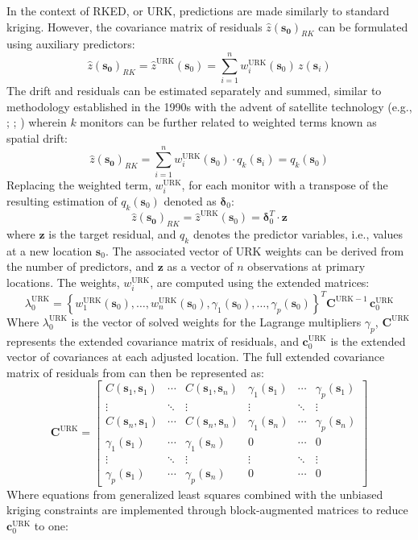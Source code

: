 In the context of RKED, or URK, predictions are made similarly to standard kriging. However, the covariance matrix of residuals $\hat{z}{(\mathbf{s}_\mathbf{0})}_{RK}$ can be formulated using auxiliary predictors: 
\[\hat{z}{(\mathbf{s}_\mathbf{0})}_{RK}=\hat{z}^{\mathrm{URK}}(\mathbf{s}_0) = \sum_{i=1}^{n} w_i^{\mathrm{URK}}(\mathbf{s}_0) \, z(\mathbf{s}_i)\]
The drift and residuals can be estimated separately and summed, similar to methodology established in the 1990s with the advent of satellite technology (e.g., \cite{ahmed1987}; \cite{odeh1995}; \cite{journel1989}) wherein $k$ monitors can be further related to weighted terms known as spatial drift: 
\[
\hat{z}{(\mathbf{s}_\mathbf{0})}_{RK}=\sum_{i=1}^{n} w_i^{\mathrm{URK}}(\mathbf{s}_0) \cdot q_k(\mathbf{s}_i) =q_k(\mathbf{s}_0)
\] 
Replacing the weighted term, $w_i^{\mathrm{URK}}$, for each monitor with a transpose of the resulting estimation of $q_k(\mathbf{s}_0)$ denoted as $\boldsymbol{\delta}_0$:
\[
\hat{z}{(\mathbf{s}_\mathbf{0})}_{RK}=\hat{z}^{\mathrm{URK}}(\mathbf{s}_0) = \boldsymbol{\delta}_0^{T} \cdot \mathbf{z}
\] where $\mathbf{z}$ is the target residual, and $q_k$ denotes the predictor variables, i.e., values at a new location $\mathbf{s}_0$. The associated vector of URK weights can be derived from the number of predictors, and $\mathbf{z}$ as a vector of $n$ observations at primary locations. The weights, $w_i^{\mathrm{URK}}$, are computed using the extended matrices:
\[
\lambda_0^{\mathrm{URK}} =
\left\{ w_1^{\mathrm{URK}}(\mathbf{s}_0), \ldots, w_n^{\mathrm{URK}}(\mathbf{s}_0), \gamma_1(\mathbf{s}_0), \ldots, \gamma_p(\mathbf{s}_0) \right\}^{T}
\mathbf{C}^{\mathrm{URK-1}} \, \mathbf{c}_0^{\mathrm{URK}}
\]
Where $\lambda_0^{\mathrm{URK}}$ is the vector of solved weights for the Lagrange multipliers $\gamma_p$, $\mathbf{C}^{\mathrm{URK}}$ represents the extended covariance matrix of residuals, and $\mathbf{c}_0^{\mathrm{URK}}$ is the extended vector of covariances at each adjusted location. The full extended covariance matrix of residuals from \textcite{webster2007} can then be represented as:
\[
\mathbf{C}^{\mathrm{URK}} =
\begin{bmatrix}
C(\mathbf{s}_1, \mathbf{s}_1) & \cdots & C(\mathbf{s}_1, \mathbf{s}_n) & \gamma_1(\mathbf{s}_1) & \cdots & \gamma_p(\mathbf{s}_1) \\
\vdots & \ddots & \vdots & \vdots & \ddots & \vdots \\
C(\mathbf{s}_n, \mathbf{s}_1) & \cdots & C(\mathbf{s}_n, \mathbf{s}_n) & \gamma_1(\mathbf{s}_n) & \cdots & \gamma_p(\mathbf{s}_n) \\
\gamma_1(\mathbf{s}_1) & \cdots & \gamma_1(\mathbf{s}_n) & 0 & \cdots & 0 \\
\vdots & \ddots & \vdots & \vdots & \ddots & \vdots \\
\gamma_p(\mathbf{s}_1) & \cdots & \gamma_p(\mathbf{s}_n) & 0 & \cdots & 0
\end{bmatrix}
\] Where equations from generalized least squares combined with the unbiased kriging constraints are implemented through block-augmented matrices to reduce $\mathbf{c}_0^{\mathrm{URK}}$ to one:
